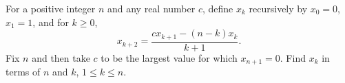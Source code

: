 For a positive integer $n$ and any real number $c$, define
$x_k$ recursively by $x_0=0$, $x_1=1$, and for $k\geq 0$,
\[x_{k+2}=\frac{cx_{k+1}-(n-k)x_k}{k+1}.\]
Fix $n$ and then take $c$ to be the largest value for which $x_{n+1}=0$.
Find $x_k$ in terms of $n$ and $k$, $1\leq k\leq n$.
